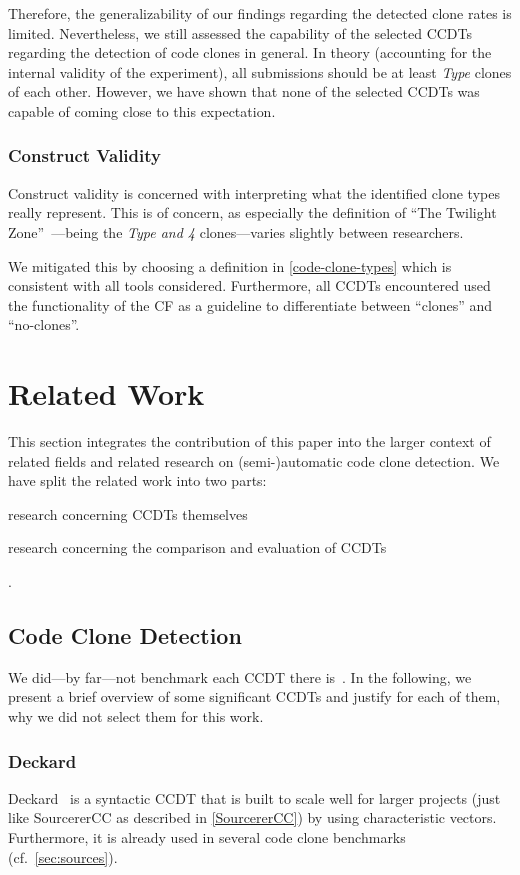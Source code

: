 \documentclass[10pt,journal,compsoc]{IEEEtran}
\def\T#1{\textsl{Type\nobreakdash-#1}}
\begin{document}
Therefore, the generalizability of our findings regarding the detected clone rates is limited. Nevertheless, we still assessed the capability of the selected CCDTs regarding the detection of code clones in general. In theory (accounting for the internal validity of the experiment),
all submissions should be at least \T4 clones of each other. However, we have shown that none of the selected CCDTs was capable of coming close to this expectation.

\subsubsection{Construct Validity}
Construct validity is concerned with interpreting what the identified clone types really represent. This is of concern, as especially the definition of \enquote{The Twilight Zone}~\cite{saini2018oreo}---being the \T{3 and 4} clones---varies slightly between researchers.

We mitigated this by choosing a definition in \cref{code-clone-types} which is consistent with all tools considered. Furthermore, all CCDTs encountered used the functionality of the CF as a guideline to differentiate between \enquote{clones} and \enquote{no-clones}.

\section{Related Work}\label{sec:related-work}
This section integrates the contribution of this paper into the larger context of related fields and related research on \mbox{(semi-)}automatic code clone detection.
We have split the related work into two parts: \begin{inlist}
  \item research concerning CCDTs themselves
  \item research concerning the comparison and evaluation of CCDTs
\end{inlist}.

\subsection{Code Clone Detection}
We did---by far---not benchmark each CCDT there is~\cite{ain2019systematic}.
In the following, we present a brief overview of some significant CCDTs and justify for each of them, why we did not select them for this work.

\subsubsection{Deckard}
Deckard~\cite{Deckard} is a syntactic CCDT that is built to scale well for larger projects (just like SourcererCC as described in \cref{SourcererCC}) by using characteristic vectors.
Furthermore, it is already used in several code clone benchmarks~\cite{wagner2014detection,10.1145/3381307.3381310} (cf.~\cref{sec:sources}).
\end{document}
